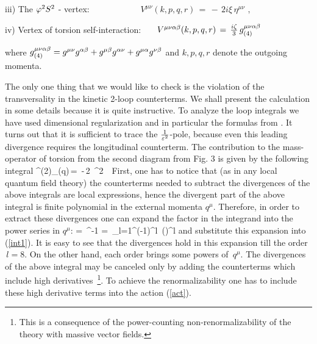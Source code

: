 \noindent
iii) The $\varphi^2 S^2$ - vertex: $\,\,\,\,\,\,\,\,\,\,\,\,
\,\,\,\,\,\,\,\,\,\,\,\,\,\,\,\,\,\,\,\,\,\,
V^{\mu\nu}(k,p,q,r)\, = \,- \,2 i\xi\,\eta^{\mu\nu}\,\,,$
\vskip 2mm

\noindent
iv) Vertex of torsion self-interaction: 
$\,\,\,\,\,\,\,\,\,V^{\mu\nu\alpha\beta}(k,p,q,r)\, =
 \,\frac{i\zeta}{3}\,g_{(4)}^{\mu\nu\alpha\beta}$
\vskip 4mm

\noindent
where $g_{(4)}^{\mu\nu\alpha\beta} = g^{\mu\nu}g^{\alpha\beta} +
g^{\mu\beta}g^{\alpha\nu} + g^{\mu\alpha}g^{\nu\beta}$ and $k,p,q,r$ denote the
outgoing momenta.

The only one thing that we would like to check is the violation of 
the transversality in the kinetic 2-loop counterterms.
We shall present the calculation in some details because it is
quite instructive.
To analyze the loop integrals we have used dimensional
regularization and in particular the formulas from 
\cite{leibr,hela}.
It turns out that it is sufficient to trace the
$\frac{1}{\varepsilon^2}$-pole, because even this leading divergence
requires the longitudinal counterterm.
The contribution to the mass-operator of torsion from the second
diagram from Fig. 3 is given by the following integral
\beq
\Pi^{(2)}_{\al\be}(q)\,=\, -\,2\, \xi^2\,
\int {} \,
\label{int1}
\eeq
First, one has to notice that (as in any local quantum field theory) 
the counterterms needed to subtract 
the divergences of the above integrals are local expressions, 
hence the divergent part of the above integral is finite polynomial 
in the external momenta $q^\mu$. Therefore, in order to extract 
these divergences one can expand the factor in the
integrand into the power series in $q^\mu$:
\beq
{} =
\,^{-1}
= \,\sum_{l=1}^{\infty}(-1)^l\,
\left(\right)^l
\label{expand}
\eeq
and substitute this expansion into (\ref{int1}). It is easy to see that
the divergences hold in this expansion till the order $\,l=8$. On the
other hand, each order brings some powers of $\,q^\mu$. 
The divergences of the above integral may be canceled only by adding 
the counterterms which include high 
derivatives~\footnote{This is a consequence of the
 power-counting non-renormalizability
of the theory with massive vector fields.}.
To achieve the renormalizability one has
 to include these high derivative terms into the action (\ref{act}). 
